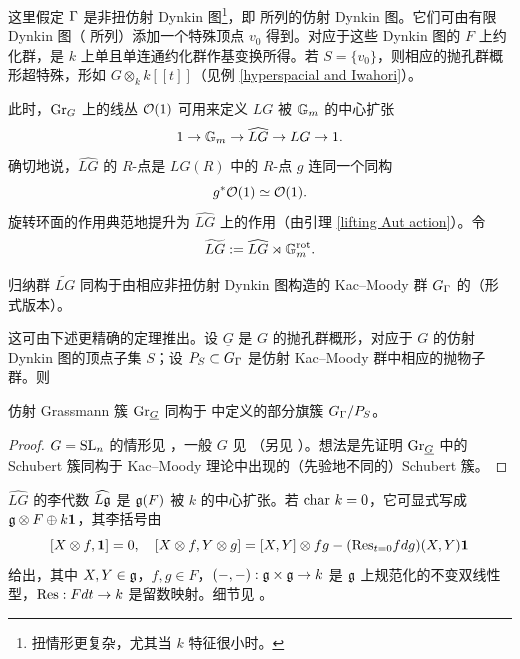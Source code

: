 这里假定 ${\Gamma}$ 是非扭仿射 Dynkin 图\footnote{扭情形更复杂，尤其当 $k$ 特征很小时。}，即 \cite[Chap. 4, TABLE Aff 1]{Kac} 所列的仿射 Dynkin 图。它们可由有限 Dynkin 图（\cite[Chap 4, TABLE Fin]{Kac} 所列）添加一个特殊顶点 $v_0$ 得到。对应于这些 Dynkin 图的 $F$ 上约化群，是 $k$ 上单且单连通约化群作基变换所得。若 $S=\{v_0\}$，则相应的抛孔群概形超特殊，形如 $G\otimes_kk[[t]]$（见例 \ref{hyperspacial and Iwahori}）。

此时，${\operatorname{Gr}}_G$ 上的线丛 ${\mathcal O}(1)$ 可用来定义 $LG$ 被 ${\mathbb G}_m$ 的中心扩张
\begin{equation}\label{central extension}
1\to{\mathbb G}_m\to \widehat{LG}\to LG\to 1.
\end{equation}
确切地说，$\widehat{LG}$ 的 $R$-点是 $LG(R)$ 中的 $R$-点 $g$ 连同一个同构
\[g^*{\mathcal O}(1)\simeq {\mathcal O}(1).\]
旋转环面的作用典范地提升为 $\widehat{LG}$ 上的作用（由引理 \ref{lifting Aut action}）。令
\[\widetilde{LG}:=\widehat{LG}\rtimes{\mathbb G}_m^{\operatorname{rot}}.\]

\begin{thm}
归纳群 $\widetilde{LG}$ 同构于由相应非扭仿射 Dynkin 图构造的 Kac--Moody 群 $G_{\Gamma}$ 的（形式版本）。
\end{thm}

这可由下述更精确的定理推出。设 $\underline G$ 是 $G$ 的抛孔群概形，对应于 $G$ 的仿射 Dynkin 图的顶点子集 $S$；设 $P_S\subset G_{\Gamma}$ 是仿射 Kac--Moody 群中相应的抛物子群。则

\begin{thm}
仿射 Grassmann 簇 ${\operatorname{Gr}}_{\underline G}$ 同构于 \cite{Ma,Ku} 中定义的部分旗簇 $G_{\Gamma}/P_S$。
\end{thm}

\begin{proof}
$G={\operatorname{SL}}_n$ 的情形见 \cite{BL}，一般 $G$ 见 \cite{Fa}（另见 \cite[\S 10]{PR}）。想法是先证明 ${\operatorname{Gr}}_{\underline G}$ 中的 Schubert 簇同构于 Kac--Moody 理论中出现的（先验地不同的）Schubert 簇。
\end{proof}

\begin{rmk}\label{2-cocycle}
$\widehat{LG}$ 的李代数 $\widehat{L{\mathfrak g}}$ 是 ${\mathfrak g}(F)$ 被 $k$ 的中心扩张。若 $\cha\ k=0$，它可显式写成 ${\mathfrak g}\otimes F\oplus k\mathbf{1}$，其李括号由
\[[X\otimes f,\mathbf{1}]=0,\quad [X\otimes f,Y\otimes g]=[X,Y]\otimes fg- ({\operatorname{Res}}_{t=0}fdg) (X,Y)\mathbf{1}\]
给出，其中 $X,Y\in {\mathfrak g}$，$f,g\in F$，$(-,-): {\mathfrak g}\times{\mathfrak g}\to k$ 是 ${\mathfrak g}$ 上规范化的不变双线性型，${\operatorname{Res}}: Fdt\to k$ 是留数映射。细节见 \cite[\S~7]{Kac}。
\end{rmk}

